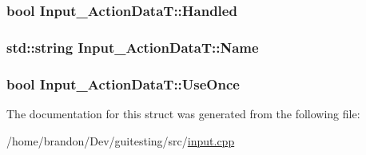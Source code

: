 \hypertarget{struct_input___action_data_t_cdf255496d583843902719cefc8abd01}{
\subsubsection[{Handled}]{\setlength{\rightskip}{0pt plus 5cm}bool {\bf Input\_\-ActionDataT::Handled}}}
\label{struct_input___action_data_t_cdf255496d583843902719cefc8abd01}


\hypertarget{struct_input___action_data_t_cfbae530d1e65cefa0e545c7f141b987}{
\subsubsection[{Name}]{\setlength{\rightskip}{0pt plus 5cm}std::string {\bf Input\_\-ActionDataT::Name}}}
\label{struct_input___action_data_t_cfbae530d1e65cefa0e545c7f141b987}


\hypertarget{struct_input___action_data_t_071f820e9d56093a4f8e3a2e998fe537}{
\subsubsection[{UseOnce}]{\setlength{\rightskip}{0pt plus 5cm}bool {\bf Input\_\-ActionDataT::UseOnce}}}
\label{struct_input___action_data_t_071f820e9d56093a4f8e3a2e998fe537}




The documentation for this struct was generated from the following file:\begin{CompactItemize}
\item 
/home/brandon/Dev/guitesting/src/\hyperlink{input_8cpp}{input.cpp}\end{CompactItemize}
